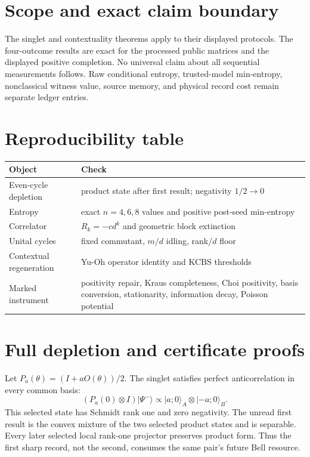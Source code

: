 \documentclass[11pt,a4paper]{article}
\begin{document}
\section{Scope and exact claim boundary}
The singlet and contextuality theorems apply to their displayed protocols. The four-outcome results are exact for the processed public matrices and the displayed positive completion. No universal claim about all sequential measurements follows. Raw conditional entropy, trusted-model min-entropy, nonclassical witness value, source memory, and physical record cost remain separate ledger entries.

\appendix
\section{Reproducibility table}
\begin{longtable}{p{.34\linewidth}p{.56\linewidth}}
\toprule
Object & Check\\\midrule
Even-cycle depletion & product state after first result; negativity $1/2\to0$\\
Entropy & exact $n=4,6,8$ values and positive post-seed min-entropy\\
Correlator & $R_k=-c d^k$ and geometric block extinction\\
Unital cycles & fixed commutant, $m/d$ idling, rank/$d$ floor\\
Contextual regeneration & Yu-Oh operator identity and KCBS thresholds\\
Marked instrument & positivity repair, Kraus completeness, Choi positivity, basis conversion, stationarity, information decay, Poisson potential\\
\bottomrule
\end{longtable}


\section{Full depletion and certificate proofs}
Let $P_a(\theta)=(I+aO(\theta))/2$. The singlet satisfies perfect anticorrelation in every common basis:
\begin{equation}
(P_a(0)\otimes I)|\Psi^-\rangle
\propto |a;0\rangle_A\otimes|-a;0\rangle_B.
\end{equation}
This selected state has Schmidt rank one and zero negativity. The unread first result is the convex mixture of the two selected product states and is separable. Every later selected local rank-one projector preserves product form. Thus the first sharp record, not the second, consumes the same pair's future Bell resource.
\end{document}
